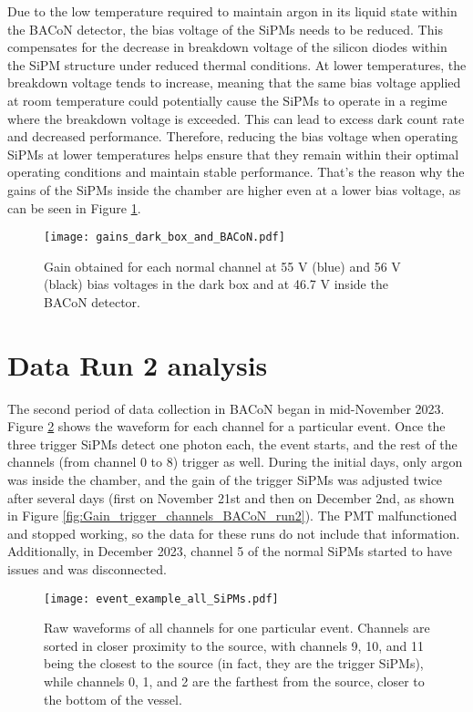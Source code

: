 \documentclass[11pt,a4paper,english,oneside, pdf]{article}
\begin{document}
	Due to the low temperature required to maintain argon in its liquid state within the BACoN detector, the bias voltage of the SiPMs needs to be reduced. This compensates for the decrease in breakdown voltage of the silicon diodes within the SiPM structure under reduced thermal conditions. At lower temperatures, the breakdown voltage tends to increase, meaning that the same bias voltage applied at room temperature could potentially cause the SiPMs to operate in a regime where the breakdown voltage is exceeded. This can lead to excess dark count rate and decreased performance. Therefore, reducing the bias voltage when operating SiPMs at lower temperatures helps ensure that they remain within their optimal operating conditions and maintain stable performance. That's the reason why the gains of the SiPMs inside the chamber are higher even at a lower bias voltage, as can be seen in Figure \ref{fig:gains_dark_box_and_BACoN}.
	
	\begin{figure}[!h]
		\begin{center}
			\texttt{[image: gains\_dark\_box\_and\_BACoN.pdf]}
			\caption{Gain obtained for each normal channel at 55 V (blue) and 56 V (black) bias voltages in the dark box and at 46.7 V inside the BACoN detector.}
			\label{fig:gains_dark_box_and_BACoN}
		\end{center}
	\end{figure}
	
	\clearpage
	
	\section{Data Run 2 analysis}
	
	The second period of data collection in BACoN began in mid-November 2023. Figure \ref{fig:event_example_all_SiPMs} shows the waveform for each channel for a particular event. Once the three trigger SiPMs detect one photon each, the event starts, and the rest of the channels (from channel 0 to 8) trigger as well. During the initial days, only argon was inside the chamber, and the gain of the trigger SiPMs was adjusted twice after several days (first on November 21st and then on December 2nd, as shown in Figure \ref{fig:Gain_trigger_channels_BACoN_run2}). The PMT malfunctioned and stopped working, so the data for these runs do not include that information. Additionally, in December 2023, channel 5 of the normal SiPMs started to have issues and was disconnected.
	
	\begin{figure}[!h]
		\begin{center}
			\texttt{[image: event\_example\_all\_SiPMs.pdf]}
			\caption{Raw waveforms of all channels for one particular event. Channels are sorted in closer proximity to the source, with channels 9, 10, and 11 being the closest to the source (in fact, they are the trigger SiPMs), while channels 0, 1, and 2 are the farthest from the source, closer to the bottom of the vessel.}
			\label{fig:event_example_all_SiPMs}
		\end{center}
	\end{figure}
	
\end{document}
